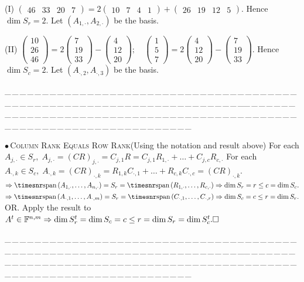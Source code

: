 \documentclass[a4paper, 11pt, UTF8]{article}
\def\Spn{{\timesnr\textup{span}}\,}
\def\Fbb{{\mathbb{F}}}
\def\BulletPoint{{\small$\bullet$}}
\def\EndI{\hspace{-3pt}}
\def\Or{\large O{\footnotesize R.} }
\def\ProblemEnding{{\tiny \_\,\_\,\_\,\_\,\_\,\_\,\_\,\_\,\_\,\_\,\_\,\_\,\_\,\_\,\_\,\_\,\_\,\_\,\_\,\_\,\_\,\_\,\_\,\_\,\_\,\_\,\_\,\_\,\_\,\_\,\_\,\_\,\_\,\_\,\_\,\_\,\_\,\_\,\_\,\_\,\_\,\_\,\_\,\_\,\_\,\_\,\_\,\_\,\_\,\_\,\_\,\_\,\_\,\_\,\_\,\_\,\_\,\_\,\_\,\_\,\_\,\_\,\_\,\_\,\_\,\_\,\_\,\_\,\_\,\_\,\_\_\,\_\,\_\,\_\,\_\,\_\,\_\,\_\,\_\,\_\,\_\,\_\,\_\,\_\,\_\,\_\,\_\,\_\,\_\,\_\,\_\,\_\,\_\,\_\,\_\,\_\,\_\,\_\,\_\,\_\,\_\,\_\,\_\,\_\,\_\,\_\,\_\,\_\,\_\,\_\,\_\,\_\,\_\,\_\,\_\,\_\,\_\,\_\,\_\,\_\,\_\,\_\,\_\,\_\,\_\,\_\,\_\,\_\,\_\,\_\,\_\,\_\,\_\,\_\,\_\,\_\,\_\,\_\,\_\,\_\,\_}}
\begin{document}
\begin{large}
(I) {\normalsize$\begin{pmatrix} 46 & 33 & 20 & 7 \end{pmatrix}=2\begin{pmatrix} 10 & 7 & 4 & 1\end{pmatrix}+\begin{pmatrix} 26 & 19 & 12 & 5\end{pmatrix}$}.
Hence $\dim S_r=2$. Let $(A_{1,\cdot},A_{2,\cdot})$ be the basis.\par\vspace{6pt}\quad\EndI
(II) {\normalsize$\begin{pmatrix} 10\\ 26\\ 46\end{pmatrix}=2\begin{pmatrix} 7\\ 19\\ 33\end{pmatrix}-\begin{pmatrix} 4\\ 12\\ 20\end{pmatrix}; \quad \begin{pmatrix} 1\\ 5\\ 7\end{pmatrix}=2\begin{pmatrix} 4\\ 12\\ 20\end{pmatrix}-\begin{pmatrix} 7\\ 19\\ 33\end{pmatrix}$}. Hence $\dim S_c=2.$ Let $(A_{\cdot,2},A_{\cdot,3})$ be the basis.\par
\ProblemEnding\par

\BulletPoint \,\hspace{1pt}\textsc{Column Rank Equals Row Rank}\quad (Using the notation and result above)\TextB{}
For each $A_{j,\cdot}\in S_r,\;A_{j,\cdot}=(CR)_{j,\cdot}=C_{j,1}R=C_{j,1}R_{1,\cdot}+\dots+C_{j,c}R_{c,\cdot}$\TextB{}
For each $A_{\cdot,k}\in S_c,\;A_{\cdot,k}=(CR)_{\cdot,k}=R_{1,k}C_{\cdot,1}+\dots+R_{c,k}C_{\cdot,c}=(CR)_{\cdot,k}.$\TextB{}
$\Rightarrow\Spn(A_{1,\cdot},\dots,A_{n,\cdot})=S_r=\Spn(R_{1,\cdot},\dots,R_{c,\cdot})\Rightarrow\dim S_r=r\leq c=\dim S_c.$\TextB{}
$\Rightarrow\Spn(A_{\cdot,1},\dots,A_{\cdot,m})=S_r=\Spn(C_{\cdot,1},\dots,C_{\cdot,r})\Rightarrow\dim S_c=c\leq r=\dim S_r.$\TextB{}
\Or Apply the result to $A^t\in\Fbb^{n,m}\Rightarrow\dim S_r^t=\dim S_c=c\leq r=\dim S_r=\dim S_c^t.\hfill\square$\par
\ProblemEnding\par


\end{large}
\end{document}

